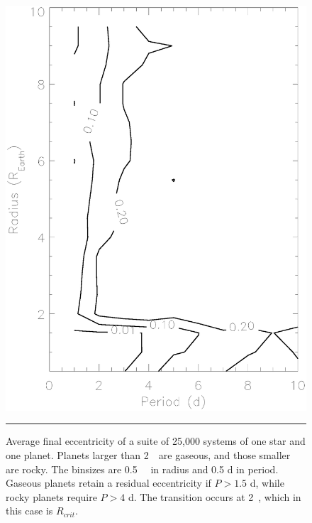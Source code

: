 \begin{figure}[t] 
  \begin{minipage}[c]{0.39\textwidth}
    \includegraphics[width=\textwidth]{figures/radper.ps}
  \end{minipage}\hfill
  \begin{minipage}[c]{0.6\textwidth}
    \caption{Average final eccentricity of a suite of 25,000
systems of one star and one planet. Planets larger than 2~\rearth~are gaseous, and 
those smaller are rocky. The binsizes are 0.5~\rearth~ in radius and 0.5 d in period.
Gaseous planets retain a residual eccentricity if $P > 1.5$ d, while rocky planets require
$P > 4$ d. The transition occurs at 2~\rearth, which in this case is $R_{crit}$. }
    \label{fig:radper}
    \hspace*{\fill}  
    \hrule
  \end{minipage}
\end{figure}


